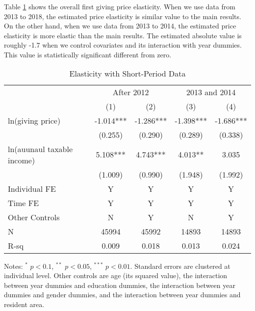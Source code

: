 \documentclass[ review  , 3p ]{elsarticle}
\begin{document}
  Table \ref{tab:kableShortElasticity1} shows the overall first giving price elasticity.
  When we use data from 2013 to 2018, the estimated price elasticity is similar value to the main results.
  On the other hand,
  when we use data from 2013 to 2014, the estimated price elasticity is more elastic than the main results.
  The estimated absolute value is roughly -1.7 when we control covariates and its interaction with year dummies.
  This value is statistically significant different from zero.

  \begin{table}

  \caption{\label{tab:kableShortElasticity1}Elasticity with Short-Period Data}
  \centering
  \fontsize{7}{9}\selectfont
  \begin{threeparttable}
  \begin{tabular}[t]{lcccc}
  \toprule
  \multicolumn{1}{c}{ } & \multicolumn{2}{c}{After 2012} & \multicolumn{2}{c}{2013 and 2014} \\
  \cmidrule(l{3pt}r{3pt}){2-3} \cmidrule(l{3pt}r{3pt}){4-5}
   & (1) & (2) & (3) & (4)\\
  \midrule
  ln(giving price) & -1.014*** & -1.286*** & -1.398*** & -1.686***\\
   & (0.255) & (0.290) & (0.289) & (0.338)\\
  ln(auunaul taxable income) & 5.108*** & 4.743*** & 4.013** & 3.035\\
   & (1.009) & (0.990) & (1.948) & (1.992)\\
  Individual FE & Y & Y & Y & Y\\
  Time FE & Y & Y & Y & Y\\
  Other Controls & N & Y & N & Y\\
  N & 45994 & 45992 & 14893 & 14893\\
  R-sq & 0.009 & 0.018 & 0.013 & 0.024\\
  \bottomrule
  \end{tabular}
  \begin{tablenotes}
  \item Notes: $^{*}$ $p < 0.1$, $^{**}$ $p < 0.05$, $^{***}$ $p < 0.01$. Standard errors are clustered at individual level. Other controls are age (its squared value), the interaction between year dummies and education dummies, the interaction between year dummies and gender dummies, and the interaction between year dummies and resident area.
  \end{tablenotes}
  \end{threeparttable}
  \end{table}
\end{document}
